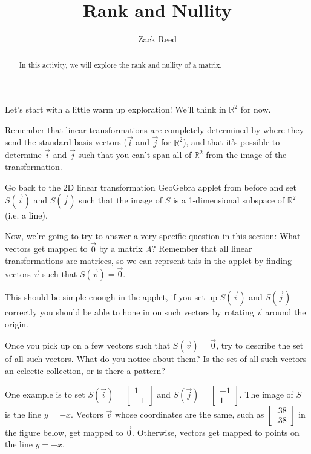 \documentclass{ximera}
\author{Zack Reed}
\title{Rank and Nullity}
\begin{document}
\begin{abstract}

In this activity, we will explore the rank and nullity of a matrix.

\end{abstract}
\maketitle

\begin{exploration}

    Let's start with a little warm up exploration! We'll think in $\mathbb{R}^2$ for now.
    
    Remember that linear transformations are completely determined by where they send the standard basis vectors ($\vec{i}$ and $\vec{j}$ for $\mathbb{R}^2$), and that it's possible to determine $\vec{i}$ and $\vec{j}$ such that you can't span all of $\mathbb{R}^2$ from the image of the transformation.

    Go back to the 2D linear transformation GeoGebra applet from before and set $S(\vec{i})$ and $S(\vec{j})$ such that the image of $S$ is a 1-dimensional subspace of $\mathbb{R}^2$ (i.e. a line).
    

    Now, we're going to try to answer a very specific question in this section: What vectors get mapped to $\vec{0}$ by a matrix $A$? Remember that all linear transformations are matrices, so we can reprsent this in the applet by finding vectors $\vec{v}$ such that $S(\vec{v})=\vec{0}$.

    This should be simple enough in the applet, if you set up $S(\vec{i})$ and $S(\vec{j})$ correctly you should be able to hone in on such vectors by rotating $\vec{v}$ around the origin.

    Once you pick up on a few vectors such that $S(\vec{v})=\vec{0}$, try to describe the set of all such vectors. What do you notice about them? Is the set of all such vectors an eclectic collection, or is there a pattern?

    \begin{solution}

        One example is to set $S(\vec{i})=\begin{bmatrix} 1 \\ -1 \end{bmatrix}$ and $S(\vec{j})=\begin{bmatrix} -1 \\ 1 \end{bmatrix}$. The image of $S$ is the line $y=-x$. Vectors $\vec{v}$ whose coordinates are the same, such as $\begin{bmatrix} .38 \\ .38 \end{bmatrix}$ in the figure below, get mapped to $\vec{0}$. Otherwise, vectors get mapped to points on the line $y=-x$. 


\end{solution}
\end{exploration}
\end{document}
